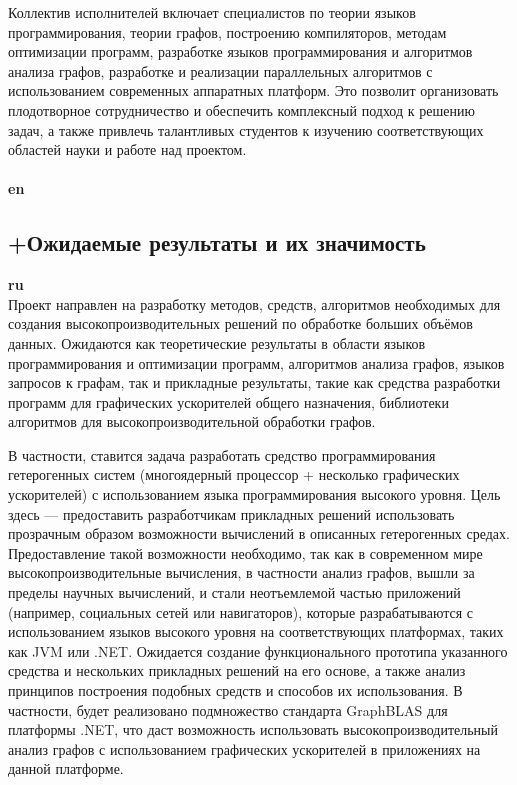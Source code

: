 \documentclass[12pt]{article}  %
\theoremstyle{remark}
\begin{document}
Коллектив исполнителей включает специалистов по теории языков программирования, теории графов, построению компиляторов, методам оптимизации программ,  разработке языков программирования и алгоритмов анализа графов, разработке и реализации параллельных алгоритмов с использованием современных аппаратных платформ. Это позволит организовать плодотворное сотрудничество и обеспечить комплексный подход к решению задач, а также привлечь талантливых студентов к изучению соответствующих областей науки и работе над проектом.
\\
\\
\textbf{en}\\

\subsection{+Ожидаемые результаты и их значимость}

\textbf{ru}\\

Проект направлен на разработку методов, средств, алгоритмов необходимых для создания высокопроизводительных решений по обработке больших объёмов данных. Ожидаются как теоретические результаты в области языков программирования и оптимизации программ, алгоритмов анализа графов, языков запросов к графам, так и прикладные результаты, такие как средства разработки программ для графических ускорителей общего назначения, библиотеки алгоритмов для высокопроизводительной обработки графов.

В частности, ставится задача разработать средство программирования гетерогенных систем (многоядерный процессор + несколько графических ускорителей) с использованием языка программирования высокого уровня. Цель здесь --- предоставить разработчикам прикладных решений использовать прозрачным образом возможности вычислений в описанных гетерогенных средах. Предоставление такой возможности необходимо, так как в современном мире высокопроизводительные вычисления, в частности анализ графов, вышли за пределы научных вычислений, и стали неотъемлемой частью приложений (например, социальных сетей или навигаторов), которые разрабатываются с использованием языков высокого уровня на соответствующих платформах, таких как JVM или .NET. Ожидается создание функционального прототипа указанного средства и нескольких прикладных решений на его основе, а также анализ принципов построения подобных средств и способов их использования. В частности, будет реализовано подмножество стандарта GraphBLAS для платформы .NET, что даст возможность использовать высокопроизводительный анализ графов с использованием графических ускорителей в приложениях на данной платформе.
\end{document}
